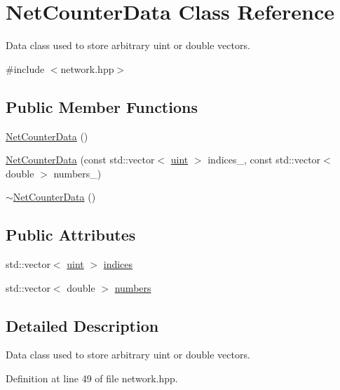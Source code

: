 \hypertarget{class_net_counter_data}{}\section{Net\+Counter\+Data Class Reference}
\label{class_net_counter_data}


Data class used to store arbitrary uint or double vectors.  




{\ttfamily \#include $<$network.\+hpp$>$}

\subsection*{Public Member Functions}
\begin{DoxyCompactItemize}
\item 
\hyperlink{class_net_counter_data_ac3a5083286ad4fad43e6b6d5db1f7caa}{Net\+Counter\+Data} ()
\item 
\hyperlink{class_net_counter_data_ac816e1f8892a4d6f500df387309c1b1b}{Net\+Counter\+Data} (const std\+::vector$<$ \hyperlink{typedefs_8hpp_a91ad9478d81a7aaf2593e8d9c3d06a14}{uint} $>$ indices\+\_\+, const std\+::vector$<$ double $>$ numbers\+\_\+)
\item 
\hyperlink{class_net_counter_data_a2e88fcc7f0296d791fe9f0facd24489f}{$\sim$\+Net\+Counter\+Data} ()
\end{DoxyCompactItemize}
\subsection*{Public Attributes}
\begin{DoxyCompactItemize}
\item 
std\+::vector$<$ \hyperlink{typedefs_8hpp_a91ad9478d81a7aaf2593e8d9c3d06a14}{uint} $>$ \hyperlink{class_net_counter_data_ae2f47af99f3fa785d3faac089ab90d83}{indices}
\item 
std\+::vector$<$ double $>$ \hyperlink{class_net_counter_data_ad218e01cd14fb4abfbe21d8d92a6cbd3}{numbers}
\end{DoxyCompactItemize}


\subsection{Detailed Description}
Data class used to store arbitrary uint or double vectors. 

Definition at line 49 of file network.\+hpp.



